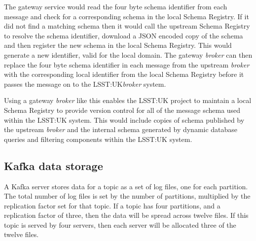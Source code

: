\documentclass{article}
\newcommand{\json} {JSON\xspace}
\newcommand{\kafka} {Kafka\xspace}
\newcommand{\kfbroker} {\textit{broker}\xspace}
\newcommand{\schemaregistry} {Schema Registry\xspace}
\newcommand{\lsstuk} {LSST:UK\xspace}
\begin{document}
The gateway service would read the four byte schema identifier from each message and check for a corresponding schema in the local \schemaregistry. If it did not find a matching schema then it would call the upstream \schemaregistry to resolve the schema identifier, download a \json encoded copy of the schema and then register the new schema in the local \schemaregistry. This would generate a new identifier, valid for the local domain.
The gateway \kfbroker can then replace the four byte schema identifier in each message from the upstream \kfbroker with the corresponding local identifier from the local \schemaregistry before it passes the message on to the \lsstuk \kfbroker system.

Using a gateway \kfbroker like this enables the \lsstuk project to maintain a local \schemaregistry to provide version control for all of the message schema used within the \lsstuk system. This would include copies of schema published by the upstream \kfbroker and the internal schema generated by dynamic database queries and filtering components within the \lsstuk system.





























\subsection{Kafka data storage}
\label{kafka-data-storage}

A \kafka server stores data for a topic as a set of log files, one for each partition.
The total number of log files is set by the number of partitions, multiplied by the replication factor set for that topic.
If a topic has four partitions, and a replication factor of three, then the data will be spread across twelve files.
If this topic is served by four servers, then each server will be allocated three of the twelve files.
\end{document}
